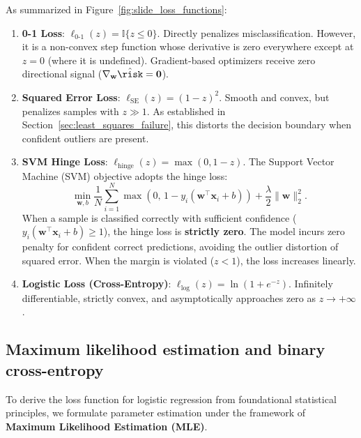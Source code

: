 As summarized in Figure~\ref{fig:slide_loss_functions}:
\begin{enumerate}
  \item \textbf{0-1 Loss}: $\ell_{0\text{-}1}(z) = \mathbb{I}\{z \le 0\}$. Directly penalizes misclassification. However, it is a non-convex step function whose derivative is zero everywhere except at $z=0$ (where it is undefined). Gradient-based optimizers receive zero directional signal ($\nabla_\mathbf{w} \hat{\risk} = \mathbf{0}$).
  \item \textbf{Squared Error Loss}: $\ell_{\text{SE}}(z) = (1 - z)^2$. Smooth and convex, but penalizes samples with $z \gg 1$. As established in Section~\ref{sec:least_squares_failure}, this distorts the decision boundary when confident outliers are present.
  \item \textbf{SVM Hinge Loss}: $\ell_{\text{hinge}}(z) = \max(0, 1 - z)$. The Support Vector Machine (SVM) objective adopts the hinge loss:
    \begin{equation}
    \min_{\mathbf{w}, b} \frac{1}{N} \sum_{i=1}^N \max\left(0, \, 1 - y_i(\mathbf{w}^\top \mathbf{x}_i + b)\right) + \frac{\lambda}{2} \|\mathbf{w}\|_2^2.
    \label{eq:svm_primal_objective}
    \end{equation}
    When a sample is classified correctly with sufficient confidence ($y_i(\mathbf{w}^\top \mathbf{x}_i + b) \ge 1$), the hinge loss is \textbf{strictly zero}. The model incurs zero penalty for confident correct predictions, avoiding the outlier distortion of squared error. When the margin is violated ($z < 1$), the loss increases linearly.
  \item \textbf{Logistic Loss (Cross-Entropy)}: $\ell_{\text{log}}(z) = \ln(1 + e^{-z})$. Infinitely differentiable, strictly convex, and asymptotically approaches zero as $z \to +\infty$.
\end{enumerate}

\subsection{Maximum likelihood estimation and binary cross-entropy}
\label{sec:maximum_likelihood_logistic}

To derive the loss function for logistic regression from foundational statistical principles, we formulate parameter estimation under the framework of \textbf{Maximum Likelihood Estimation (MLE)}.

